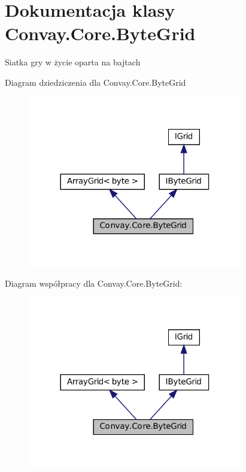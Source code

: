 \hypertarget{class_convay_1_1_core_1_1_byte_grid}{}\section{Dokumentacja klasy Convay.\+Core.\+Byte\+Grid}
\label{class_convay_1_1_core_1_1_byte_grid}


Siatka gry w życie oparta na bajtach  




Diagram dziedziczenia dla Convay.\+Core.\+Byte\+Grid
\nopagebreak
\begin{figure}[H]
\begin{center}
\leavevmode
\includegraphics[width=266pt]{class_convay_1_1_core_1_1_byte_grid__inherit__graph}
\end{center}
\end{figure}


Diagram współpracy dla Convay.\+Core.\+Byte\+Grid\+:
\nopagebreak
\begin{figure}[H]
\begin{center}
\leavevmode
\includegraphics[width=266pt]{class_convay_1_1_core_1_1_byte_grid__coll__graph}
\end{center}
\end{figure}
